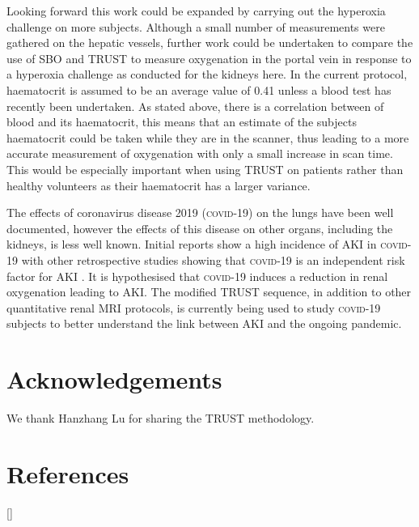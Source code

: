 Looking forward this work could be expanded by carrying out the hyperoxia challenge on more subjects. Although a small number of measurements were gathered on the hepatic vessels, further work could be undertaken to compare the use of \ac{SBO} and \ac{TRUST} to measure oxygenation in the portal vein in response to a hyperoxia challenge as conducted for the kidneys here. In the current protocol, haematocrit is assumed to be an average value of 0.41 unless a blood test has recently been undertaken. As stated above, there is a correlation between \tone of blood and its haematocrit, this means that an estimate of the subjects haematocrit could be taken while they are in the scanner, thus leading to a more accurate measurement of oxygenation with only a small increase in scan time. This would be especially important when using \ac{TRUST} on patients rather than healthy volunteers as their haematocrit has a larger variance. 

The effects of coronavirus disease 2019 (\textsc{covid}-19) on the lungs have been well documented, however the effects of this disease on other organs, including the kidneys, is less well known. Initial reports show a high incidence of \ac{AKI} in \textsc{covid}-19 \cite{selby_covid-19_2020, fisher_aki_2020, gabarre_acute_2020} with other retrospective studies showing that \textsc{covid}-19 is an independent risk factor for \ac{AKI} \cite{kolhe_acute_2020-1, adapa_covid-19_2020}. It is hypothesised that \textsc{covid}-19 induces a reduction in renal oxygenation leading to \ac{AKI}. The modified \ac{TRUST} sequence, in addition to other quantitative renal \ac{MRI} protocols, is currently being used to study \textsc{covid}-19 subjects to better understand the link between \ac{AKI} and the ongoing pandemic.

\section{Acknowledgements}

We thank Hanzhang Lu for sharing the TRUST methodology.

\newpage
\section{References}
[\refname]{}
\printbibliography